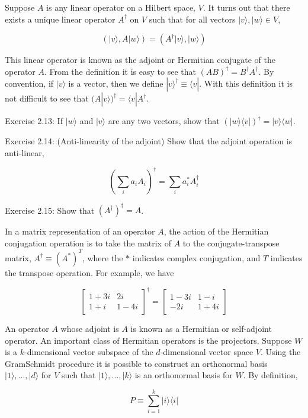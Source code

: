 Suppose $A$ is any linear operator on a Hilbert space, $V$. It turns out that there exists a unique linear operator $A^{\dagger}$ on $V$ such that for all vectors $|v\rangle,|w\rangle \in V$,

$$
(|v\rangle, A|w\rangle)=\left(A^{\dagger}|v\rangle,|w\rangle\right)
$$

This linear operator is known as the adjoint or Hermitian conjugate of the operator $A$. From the definition it is easy to see that $(A B)^{\dagger}=B^{\dagger} A^{\dagger}$. By convention, if $|v\rangle$ is a vector, then we define $|v\rangle^{\dagger} \equiv\langle v|$. With this definition it is not difficult to see that $(A|v\rangle)^{\dagger}=\langle v| A^{\dagger}$.

Exercise 2.13: If $|w\rangle$ and $|v\rangle$ are any two vectors, show that $(|w\rangle\langle v|)^{\dagger}=|v\rangle\langle w|$.

Exercise 2.14: (Anti-linearity of the adjoint) Show that the adjoint operation is anti-linear,

$$
\left(\sum_{i} a_{i} A_{i}\right)^{\dagger}=\sum_{i} a_{i}^{*} A_{i}^{\dagger}
$$

Exercise 2.15: Show that $\left(A^{\dagger}\right)^{\dagger}=A$.

In a matrix representation of an operator $A$, the action of the Hermitian conjugation operation is to take the matrix of $A$ to the conjugate-transpose matrix, $A^{\dagger} \equiv\left(A^{*}\right)^{T}$, where the $*$ indicates complex conjugation, and $T$ indicates the transpose operation. For example, we have

$$
\left[\begin{array}{cc}
1+3 i & 2 i \\
1+i & 1-4 i
\end{array}\right]^{\dagger}=\left[\begin{array}{cc}
1-3 i & 1-i \\
-2 i & 1+4 i
\end{array}\right]
$$

An operator $A$ whose adjoint is $A$ is known as a Hermitian or self-adjoint operator. An important class of Hermitian operators is the projectors. Suppose $W$ is a $k$-dimensional vector subspace of the $d$-dimensional vector space $V$. Using the GramSchmidt procedure it is possible to construct an orthonormal basis $|1\rangle, \ldots,|d\rangle$ for $V$ such that $|1\rangle, \ldots,|k\rangle$ is an orthonormal basis for $W$. By definition,

$$
P \equiv \sum_{i=1}^{k}|i\rangle\langle i|
$$

